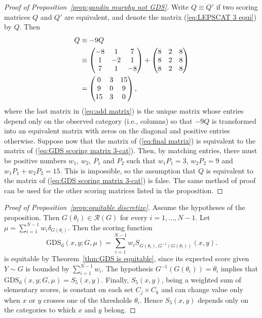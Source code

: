 \documentclass[10pt]{article} %
\theoremstyle{theorem}
\theoremstyle{definition}
\newcommand{\GDSd}{\mathrm{GDS}_\mathrm{d}}
\newcommand{\RG}{\mathcal{R}(G)}
\begin{document}
\begin{proof}[Proof of Proposition~\ref{prop:gandin murphy not GDS}] Write $Q \equiv Q'$ if two scoring matrices $Q$ and $Q'$ are equivalent, and denote the matrix (\ref{eq:LEPSCAT 3 equi}) by $Q$. Then 
\begin{align}
Q 
&\equiv -9Q \notag \\
&\equiv
\begin{pmatrix}
-8 & 1 & 7 \\
1 & -2 & 1 \\
7 & 1 & -8
\end{pmatrix}
+
\begin{pmatrix}
8 & 2 & 8 \\
8 & 2 & 8 \\
8 & 2 & 8
\end{pmatrix} \label{eq:add matrix} \\
&=
\begin{pmatrix}
0 & 3 & 15 \\
9 & 0 & 9 \\
15 & 3 & 0
\end{pmatrix}, \label{eq:final matrix}
\end{align}
where the last matrix in (\ref{eq:add matrix}) is the unique matrix whose entries depend only on the observed category (i.e., columns) so that $-9Q$ is transformed into an equivalent matrix with zeros on the diagonal and positive entries otherwise. Suppose now that the matrix of (\ref{eq:final matrix}) is equivalent to the matrix of (\ref{eq:GDS scoring matrix 3-cat}). Then, by matching entries, there must be positive numbers $w_1$, $w_2$, $P_1$ and $P_2$ such that $w_1 P_1=3$, $w_2 P_2=9$ and $w_1 P_1+w_2 P_2=15$. This is impossible, so the assumption that $Q$ is equivalent to the matrix of (\ref{eq:GDS scoring matrix 3-cat}) is false. The same method of proof can be used for the other scoring matrices listed in the proposition.
\end{proof}


\begin{proof}[Proof of Proposition~\ref{prop:equitable discretize}]
Assume the hypotheses of the proposition. Then $G(\theta_i)\in\RG$ for every $i=1,\ldots,N-1$. Let $\mu=\sum_{i=1}^{N-1} w_i \delta_{G(\theta_i)}$. Then the scoring function
\[
\GDSd(x,y;G,\mu)=\sum_{i=1}^{N-1} w_i S_{G(\theta_i), G^{-1}(G(\theta_i))}(x,y).
\]
is equitable by Theorem~\ref{thm:GDS is equitable}, since its expected score given $Y\sim G$ is bounded by $\sum_{i=1}^{N-1}w_i$. The hypothesis $G^{-1}(G(\theta_i)) = \theta_i$ implies that $\GDSd(x,y;G,\mu)=S_5(x,y)$. Finally, $S_5(x,y)$, being a weighted sum of elementary scores, is constant on each set $C_j \times C_k$ and can change value only when $x$ or $y$ crosses one of the thresholds $\theta_i$. Hence $S_5(x,y)$ depends only on the categories to which $x$ and $y$ belong.
\end{proof}
\end{document}
